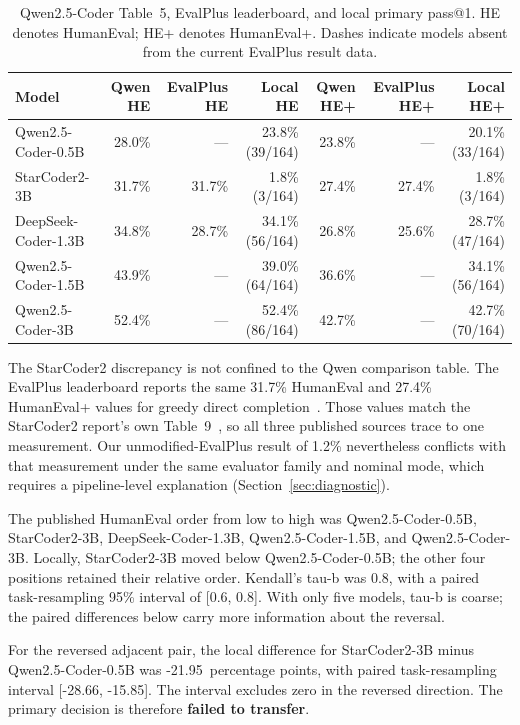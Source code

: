 \documentclass[10pt,twocolumn]{article}
\newcommand{\pp}{percentage points}
\begin{document}
\begin{table}[t]
\centering
\caption{Qwen2.5-Coder Table~5, EvalPlus leaderboard, and local primary pass@1. HE denotes HumanEval; HE+ denotes HumanEval+. Dashes indicate models absent from the current EvalPlus result data.}
\label{tab:results}
\scriptsize
\begin{tabular}{@{}lrrrrrr@{}}
\toprule
Model & Qwen HE & EvalPlus HE & Local HE & Qwen HE+ & EvalPlus HE+ & Local HE+ \\
\midrule
Qwen2.5-Coder-0.5B & 28.0\% & --- & 23.8\% (39/164) & 23.8\% & --- & 20.1\% (33/164) \\
StarCoder2-3B & 31.7\% & 31.7\% & 1.8\% (3/164) & 27.4\% & 27.4\% & 1.8\% (3/164) \\
DeepSeek-Coder-1.3B & 34.8\% & 28.7\% & 34.1\% (56/164) & 26.8\% & 25.6\% & 28.7\% (47/164) \\
Qwen2.5-Coder-1.5B & 43.9\% & --- & 39.0\% (64/164) & 36.6\% & --- & 34.1\% (56/164) \\
Qwen2.5-Coder-3B & 52.4\% & --- & 52.4\% (86/164) & 42.7\% & --- & 42.7\% (70/164) \\
\bottomrule
\end{tabular}
\end{table}

The StarCoder2 discrepancy is not confined to the Qwen comparison table. The EvalPlus leaderboard reports the same 31.7\% HumanEval and 27.4\% HumanEval+ values for greedy direct completion~\citep{evalplus2026leaderboard,evalplus2026setup}. Those values match the StarCoder2 report's own Table~9~\citep{lozhkov2024starcoder2}, so all three published sources trace to one measurement. Our unmodified-EvalPlus result of 1.2\% nevertheless conflicts with that measurement under the same evaluator family and nominal mode, which requires a pipeline-level explanation (Section~\ref{sec:diagnostic}).

The published HumanEval order from low to high was Qwen2.5-Coder-0.5B, StarCoder2-3B, DeepSeek-Coder-1.3B, Qwen2.5-Coder-1.5B, and Qwen2.5-Coder-3B. Locally, StarCoder2-3B moved below Qwen2.5-Coder-0.5B; the other four positions retained their relative order. Kendall's tau-b was 0.8, with a paired task-resampling 95\% interval of [0.6, 0.8]. With only five models, tau-b is coarse; the paired differences below carry more information about the reversal.

For the reversed adjacent pair, the local difference for StarCoder2-3B minus Qwen2.5-Coder-0.5B was -21.95~\pp{}, with paired task-resampling interval [-28.66, -15.85]. The interval excludes zero in the reversed direction. The primary decision is therefore \textbf{failed to transfer}.
\end{document}
